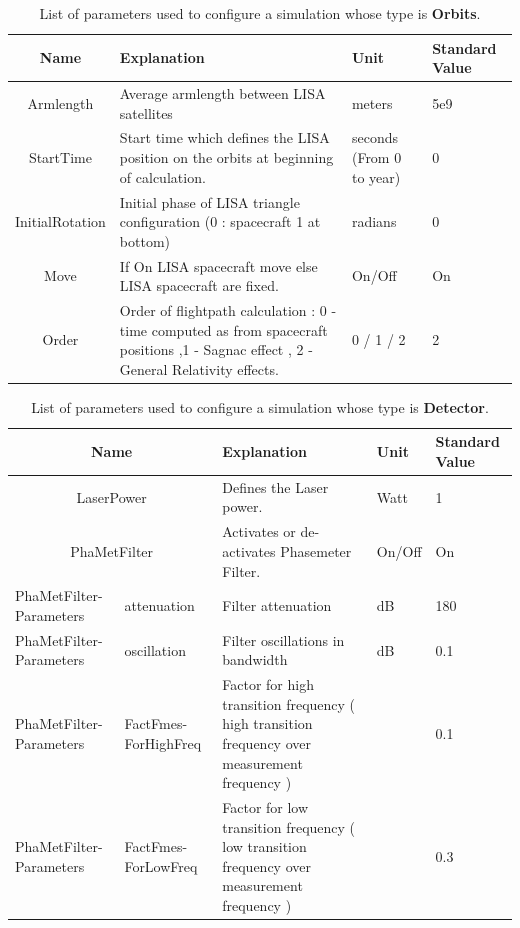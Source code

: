 \documentclass[a4paper,english,12pt]{article}
\begin{document}
\begin{table}[p]
\caption{List of parameters used to configure a simulation whose type is \textbf{Orbits}. }
\begin{center} 
\begin{tabular}{|c|p{}|p{}|p{}|} 
\hline
Name & Explanation & Unit & Standard Value  \\ 
\hline
 Armlength & Average armlength between LISA satellites & meters & 5e9 \\ 
\hline 
 StartTime & Start time which defines the LISA position on the orbits at beginning of calculation.  & seconds (From 0 to year) & 0 \\ 
\hline 
 InitialRotation & Initial phase of LISA triangle configuration (0 : spacecraft 1 at bottom) & radians & 0 \\ 
\hline 
 Move & If On LISA spacecraft move else LISA spacecraft are fixed.  & On/Off & On \\ 
\hline 
 Order & Order of flightpath calculation : 0 - time computed as from spacecraft positions ,1 - Sagnac effect , 2 - General  Relativity effects.  & 0 / 1 / 2 & 2 \\ 
\hline 
\end{tabular} 
\end{center} 
\label{table_paramOrbits} 
\end{table}

\begin{table}[p]
\caption{List of parameters used to configure a simulation whose type is \textbf{Detector}. }
\begin{center} 
\begin{tabular}{|p{}|p{}|p{}|p{}|p{}|} 
\hline 
 \multicolumn{2}{|c|}{Name} & Explanation & Unit & Standard Value  \\ 
\hline
 \multicolumn{2}{|c|}{LaserPower} & Defines the Laser power.  & Watt & 1 \\ 
\hline 
\multicolumn{2}{|c|}{PhaMetFilter} & Activates or de-activates Phasemeter Filter.  & On/Off & On \\ 
\hline 
 PhaMetFilter-Parameters  &  attenuation &  Filter attenuation & dB & 180 \\
 \hline
 PhaMetFilter-Parameters  &  oscillation &  Filter oscillations in bandwidth & dB & 0.1 \\ 
 \hline
 PhaMetFilter-Parameters  &  FactFmes-ForHighFreq & Factor for high transition frequency ( high transition frequency over measurement frequency ) &  & 0.1 \\ 
 \hline
 PhaMetFilter-Parameters  & FactFmes-ForLowFreq & Factor for  low transition frequency ( low transition frequency over measurement frequency ) &  & 0.3 \\ 
 \hline
\end{tabular} 
\end{center} 
\label{table_paramDetector} 
\end{table}
\end{document}
